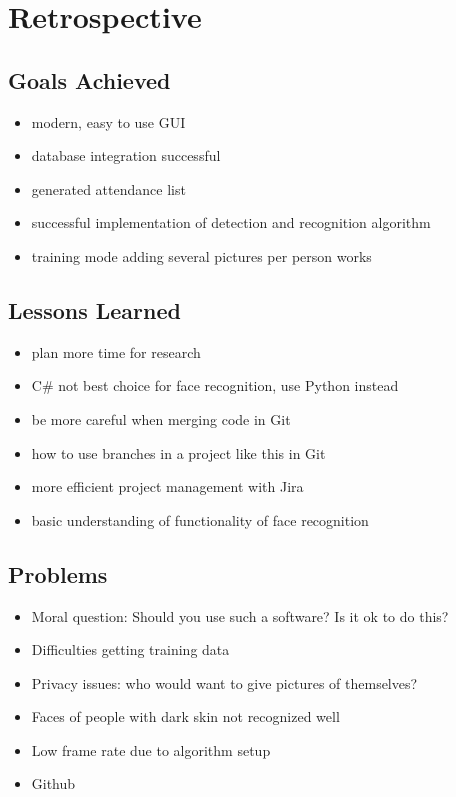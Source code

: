 \documentclass[12pt, a4paper]{article}
\begin{document}
\newpage


\section{Retrospective}

\subsection{Goals Achieved}
\begin{itemize}
\item  modern, easy to use GUI
\item  database integration successful
\item  generated attendance list
\item  successful implementation of detection and recognition algorithm
\item  training mode adding several pictures per person works
\end{itemize}

\subsection{Lessons Learned}

\begin{itemize}
\item  plan more time for research
\item  C\# not best choice for face recognition, use Python instead
\item  be more careful when merging code in Git
\item  how to use branches in a project like this in Git
\item  more efficient project management with Jira
\item  basic understanding of functionality of face recognition
\end{itemize}

\subsection{Problems}

\begin{itemize}
\item  Moral question: Should you use such a software? Is it ok to do this?
\item  Difficulties getting training data
\item  Privacy issues: who would want to give pictures of themselves?
\item  Faces of people with dark skin not recognized well
\item  Low frame rate due to algorithm setup
\item  Github
\end{itemize}
\end{document}
